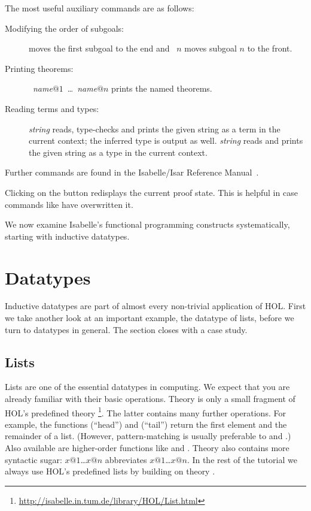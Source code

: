 The most useful auxiliary commands are as follows:
\begin{description}
\item[Modifying the order of subgoals:]
 moves the first subgoal to the end and
~$n$ moves subgoal $n$ to the front.
\item[Printing theorems:]
  ~\textit{name}$@1$~\dots~\textit{name}$@n$
  prints the named theorems.
\item[Reading terms and types:] 
  \textit{string} reads, type-checks and prints the given string as a term in
  the current context; the inferred type is output as well.
   \textit{string} reads and prints the given
  string as a type in the current context.
\end{description}
Further commands are found in the Isabelle/Isar Reference
Manual~\cite{isabelle-isar-ref}.

\begin{pgnote}
Clicking on the  button redisplays the current proof state.
This is helpful in case commands like  have overwritten it.
\end{pgnote}

We now examine Isabelle's functional programming constructs systematically,
starting with inductive datatypes.


\section{Datatypes}
\label{sec:datatype}

%
Inductive datatypes are part of almost every non-trivial application of HOL.
First we take another look at an important example, the datatype of
lists, before we turn to datatypes in general. The section closes with a
case study.


\subsection{Lists}

%
Lists are one of the essential datatypes in computing.  We expect that you
are already familiar with their basic operations.
Theory  is only a small fragment of HOL's predefined theory
\footnote{\url{http://isabelle.in.tum.de/library/HOL/List.html}}.
The latter contains many further operations. For example, the functions
 (``head'') and  (``tail'') return the first
element and the remainder of a list. (However, pattern-matching is usually
preferable to  and .)  
Also available are higher-order functions like  and .
Theory  also contains
more syntactic sugar: \isa{[}$x@1$\isa{,}\dots\isa{,}$x@n$\isa{]} abbreviates
$x@1$\isa{\#}\dots\isa{\#}$x@n$\isa{\#[]}.  In the rest of the tutorial we
always use HOL's predefined lists by building on theory .


